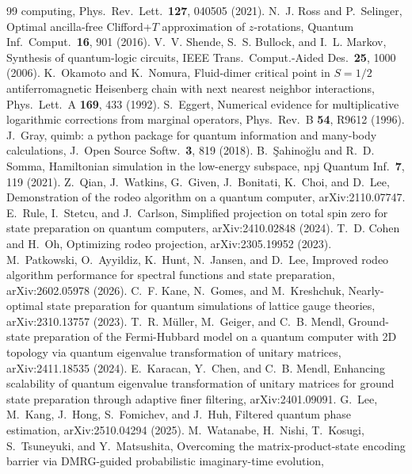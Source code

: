 \documentclass[aps,pra,twocolumn,superscriptaddress,nofootinbib]{revtex4-2}
\begin{document}
\begin{thebibliography}{99}
  computing, Phys.\ Rev.\ Lett.\ \textbf{127}, 040505 (2021).
 N.~J. Ross and P.~Selinger, Optimal ancilla-free Clifford+$T$ approximation of
  $z$-rotations, Quantum Inf.\ Comput.\ \textbf{16}, 901 (2016).
 V.~V. Shende, S.~S. Bullock, and I.~L. Markov, Synthesis of quantum-logic circuits,
  IEEE Trans.\ Comput.-Aided Des.\ \textbf{25}, 1000 (2006).
 K.~Okamoto and K.~Nomura, Fluid-dimer critical point in $S=1/2$ antiferromagnetic
  Heisenberg chain with next nearest neighbor interactions, Phys.\ Lett.\ A \textbf{169}, 433 (1992).
 S.~Eggert, Numerical evidence for multiplicative logarithmic corrections from
  marginal operators, Phys.\ Rev.\ B \textbf{54}, R9612 (1996).
 J.~Gray, quimb: a python package for quantum information and many-body calculations,
  J.\ Open Source Softw.\ \textbf{3}, 819 (2018).
 B.~\c{S}ahino\u{g}lu and R.~D. Somma, Hamiltonian simulation in the low-energy
  subspace, npj Quantum Inf.\ \textbf{7}, 119 (2021).
 Z.~Qian, J.~Watkins, G.~Given, J.~Bonitati, K.~Choi, and D.~Lee, Demonstration of the rodeo
  algorithm on a quantum computer, arXiv:2110.07747.
 E.~Rule, I.~Stetcu, and J.~Carlson, Simplified projection on total spin zero for state
  preparation on quantum computers, arXiv:2410.02848 (2024).
 T.~D. Cohen and H.~Oh, Optimizing rodeo projection, arXiv:2305.19952 (2023).
 M.~Patkowski, O.~Ayyildiz, K.~Hunt, N.~Jansen, and D.~Lee, Improved rodeo algorithm
  performance for spectral functions and state preparation, arXiv:2602.05978 (2026).
 C.~F. Kane, N.~Gomes, and M.~Kreshchuk, Nearly-optimal state preparation for quantum
  simulations of lattice gauge theories, arXiv:2310.13757 (2023).
 T.~R. M\"uller, M.~Geiger, and C.~B. Mendl, Ground-state preparation of the Fermi-Hubbard
  model on a quantum computer with 2D topology via quantum eigenvalue transformation of unitary matrices,
  arXiv:2411.18535 (2024).
 E.~Karacan, Y.~Chen, and C.~B. Mendl, Enhancing scalability of quantum eigenvalue
  transformation of unitary matrices for ground state preparation through adaptive finer filtering,
  arXiv:2401.09091.
 G.~Lee, M.~Kang, J.~Hong, S.~Fomichev, and J.~Huh, Filtered quantum phase estimation,
  arXiv:2510.04294 (2025).
 M.~Watanabe, H.~Nishi, T.~Kosugi, S.~Tsuneyuki, and Y.~Matsushita, Overcoming the
  matrix-product-state encoding barrier via DMRG-guided probabilistic imaginary-time evolution,

\end{thebibliography}
\end{document}
